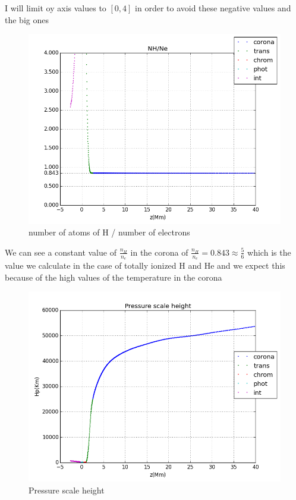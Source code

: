 \documentclass[10pt]{book}
\begin{document}
I will limit oy axis values to $ [0,4]$ in order to avoid these negative values and the big ones 


\begin{figure}[H]
 \centering
 \includegraphics[scale=0.5]{nHDivNe.png}
 \caption{number of atoms of H / number of electrons }
\end{figure}

We can see a constant value of $\frac{n_H}{n_e}$ in the corona of $\frac{n_H}{n_e} = 0.843 \approx  \frac{5}{6}$ 
which is the value we calculate in the case of totally ionized H and He and we expect this because of the high values of
the temperature in the corona



\begin{figure}[H]
 \centering
 \includegraphics[scale=0.5]{hpLayers.png}
 \caption{Pressure scale height}
\end{figure}
\end{document}
